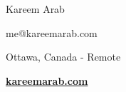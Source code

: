 \documentclass[9pt]{article}
\begin{document}
    \begin{changemargin}{2cm}{-2cm}
        \begin{center}
        {\huge Kareem Arab}\par\smallskip\smallskip

        \begin{minipage}[b]{0.33333\textwidth}
        \centering
            me@kareemarab.com  \par
            Ottawa, Canada - Remote\par
            \textbf{\href{http://kareemarab.com}{kareemarab.com}}
        \end{minipage}
        \end{center}
    \end{changemargin}
\end{document}
